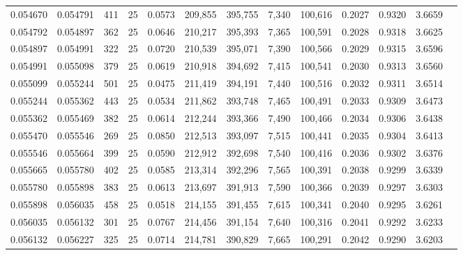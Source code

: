 \begin{tabular}{rrrrrrrrrrrrr}
0.054670 & 0.054791 &   411 &  25 &                                     0.0573 & 209,855 & 395,755 &   7,340 & 100,616 & 0.2027 & 0.9320 & 3.6659 \\
0.054792 & 0.054897 &   362 &  25 &                                     0.0646 & 210,217 & 395,393 &   7,365 & 100,591 & 0.2028 & 0.9318 & 3.6625 \\
0.054897 & 0.054991 &   322 &  25 &                                     0.0720 & 210,539 & 395,071 &   7,390 & 100,566 & 0.2029 & 0.9315 & 3.6596 \\
0.054991 & 0.055098 &   379 &  25 &                                     0.0619 & 210,918 & 394,692 &   7,415 & 100,541 & 0.2030 & 0.9313 & 3.6560 \\
0.055099 & 0.055244 &   501 &  25 &                                     0.0475 & 211,419 & 394,191 &   7,440 & 100,516 & 0.2032 & 0.9311 & 3.6514 \\
0.055244 & 0.055362 &   443 &  25 &                                     0.0534 & 211,862 & 393,748 &   7,465 & 100,491 & 0.2033 & 0.9309 & 3.6473 \\
0.055362 & 0.055469 &   382 &  25 &                                     0.0614 & 212,244 & 393,366 &   7,490 & 100,466 & 0.2034 & 0.9306 & 3.6438 \\
0.055470 & 0.055546 &   269 &  25 &                                     0.0850 & 212,513 & 393,097 &   7,515 & 100,441 & 0.2035 & 0.9304 & 3.6413 \\
0.055546 & 0.055664 &   399 &  25 &                                     0.0590 & 212,912 & 392,698 &   7,540 & 100,416 & 0.2036 & 0.9302 & 3.6376 \\
0.055665 & 0.055780 &   402 &  25 &                                     0.0585 & 213,314 & 392,296 &   7,565 & 100,391 & 0.2038 & 0.9299 & 3.6339 \\
0.055780 & 0.055898 &   383 &  25 &                                     0.0613 & 213,697 & 391,913 &   7,590 & 100,366 & 0.2039 & 0.9297 & 3.6303 \\
0.055898 & 0.056035 &   458 &  25 &                                     0.0518 & 214,155 & 391,455 &   7,615 & 100,341 & 0.2040 & 0.9295 & 3.6261 \\
0.056035 & 0.056132 &   301 &  25 &                                     0.0767 & 214,456 & 391,154 &   7,640 & 100,316 & 0.2041 & 0.9292 & 3.6233 \\
0.056132 & 0.056227 &   325 &  25 &                                     0.0714 & 214,781 & 390,829 &   7,665 & 100,291 & 0.2042 & 0.9290 & 3.6203 \\

\end{tabular}
